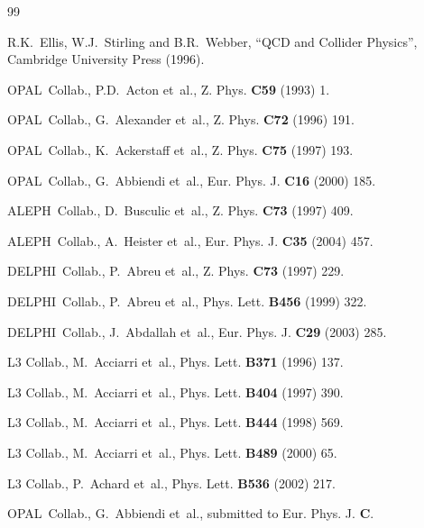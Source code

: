 \documentclass[12pt,a4paper,twoside]{article}
\newcommand{\epem}   {\ensuremath{\mathrm{e^+e^-}}}
\newcommand{\as}     {\ensuremath{\alpha_{\mathrm{s}}}}
\newcommand{\Opal}{\mbox{\rm OPAL}}
\newcommand{\Aleph}{\mbox{\rm ALEPH}}
\newcommand{\Delphi}{\mbox{\rm DELPHI}}
\newcommand{\qcd}{\mbox{QCD}}
\begin{document}
\begin{thebibliography}{99}

R.K.~Ellis, W.J.~Stirling and B.R.~Webber, ``QCD and Collider Physics'', 
Cambridge University Press (1996).

\Opal\ Collab., P.D.~Acton et~al., Z. Phys. {\bf C59} (1993) 1.

\Opal\ Collab., G.~Alexander et~al., Z. Phys. {\bf C72} (1996) 191.

\Opal\ Collab., K.~Ackerstaff et~al., Z. Phys. {\bf C75} (1997) 193.

\Opal\ Collab., G.~Abbiendi et~al., Eur. Phys. J. {\bf C16} (2000) 185.

\Aleph\ Collab., D.~Busculic et~al., Z. Phys. {\bf C73} (1997) 409.

\Aleph\ Collab., A.~Heister et~al., Eur. Phys. J. {\bf C35} (2004) 457.

\Delphi\ Collab., P.~Abreu et~al., Z. Phys. {\bf C73} (1997) 229.

\Delphi\ Collab., P.~Abreu et~al., Phys. Lett. {\bf B456} (1999) 322.

\Delphi\ Collab., J.~Abdallah et~al., Eur. Phys. J. {\bf C29} (2003) 285.

L3 Collab., M.~Acciarri et~al., Phys. Lett. {\bf B371} (1996) 137.

L3 Collab., M.~Acciarri et~al.,  Phys. Lett. {\bf B404} (1997) 390. 

L3 Collab., M.~Acciarri et~al.,  Phys. Lett. {\bf B444} (1998) 569.

L3 Collab., M.~Acciarri et~al.,  Phys. Lett. {\bf B489} (2000) 65.

L3 Collab., P.~Achard et~al.,  Phys. Lett. {\bf B536} (2002) 217.

\Opal\ Collab., G.~Abbiendi et~al., submitted to Eur. Phys. J. {\bf C}.




\end{thebibliography}
\end{document}
